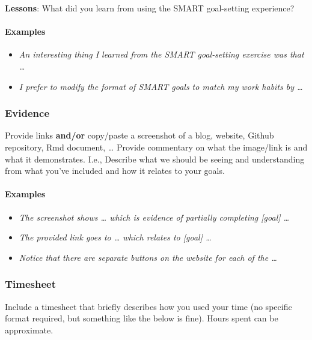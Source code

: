 \documentclass[
  openany]{book}
\providecommand{\tightlist}{%
  \setlength{\itemsep}{0pt}\setlength{\parskip}{0pt}}
\begin{document}
\textbf{Lessons}: What did you learn from using the SMART goal-setting experience?

\hypertarget{examples-2}{%
\paragraph{Examples}\label{examples-2}}

\begin{itemize}
\tightlist
\item
  \emph{An interesting thing I learned from the SMART goal-setting exercise was that \ldots{}}\\
\item
  \emph{I prefer to modify the format of SMART goals to match my work habits by \ldots{}}
\end{itemize}

\hypertarget{evidence}{%
\subsubsection{Evidence}\label{evidence}}

Provide links \textbf{and/or} copy/paste a screenshot of a blog, website, Github repository, Rmd document, \ldots{} Provide commentary on what the image/link is and what it demonstrates. I.e., Describe what we should be seeing and understanding from what you've included and how it relates to your goals.

\hypertarget{examples-3}{%
\paragraph{Examples}\label{examples-3}}

\begin{itemize}
\item
  \emph{The screenshot shows \ldots{} which is evidence of partially completing {[}goal{]} \ldots{}}
\item
  \emph{The provided link goes to \ldots{} which relates to {[}goal{]} \ldots{}}
\item
  \emph{Notice that there are separate buttons on the website for each of the \ldots{}}
\end{itemize}

\hypertarget{timesheet}{%
\subsubsection{Timesheet}\label{timesheet}}

Include a timesheet that briefly describes how you used your time (no specific format required, but something like the below is fine). Hours spent can be approximate.
\end{document}
